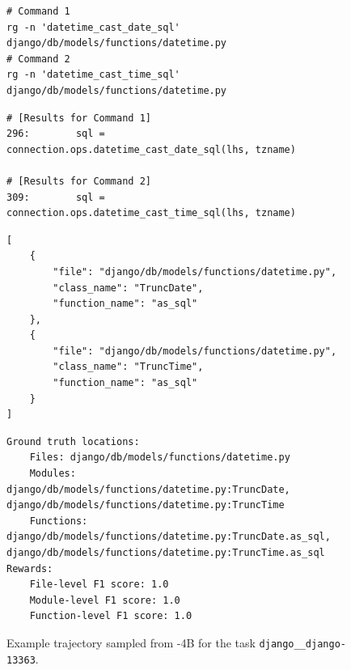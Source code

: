 \begin{figure}[!ht]
    \centering
\begin{tcolorbox}[colback=blue!3!white, colframe=blue!75!black, title={\small Action 3 (Terminal Tool - 2 parallel calls)}]
\begin{lstlisting}[basicstyle=\fontsize{7.5}{8.5}\ttfamily, breaklines=true]
# Command 1
rg -n 'datetime_cast_date_sql' django/db/models/functions/datetime.py
# Command 2
rg -n 'datetime_cast_time_sql' django/db/models/functions/datetime.py
\end{lstlisting}
\end{tcolorbox}

\begin{tcolorbox}[colback=orange!5!white, colframe=orange!75!black, title={\small Observation 3}]
\begin{lstlisting}[basicstyle=\fontsize{7.5}{8.5}\ttfamily, breaklines=true]
# [Results for Command 1]
296:        sql = connection.ops.datetime_cast_date_sql(lhs, tzname)

# [Results for Command 2]
309:        sql = connection.ops.datetime_cast_time_sql(lhs, tzname)
\end{lstlisting}
\end{tcolorbox}

\begin{tcolorbox}[colback=blue!3!white, colframe=blue!75!black, title={\small Action 4 (Localization Finish Tool - Agent Loop Terminated)}]
\begin{lstlisting}[basicstyle=\fontsize{7.5}{8.5}\ttfamily, breaklines=true]
[
    {
        "file": "django/db/models/functions/datetime.py",
        "class_name": "TruncDate",
        "function_name": "as_sql"
    },
    {
        "file": "django/db/models/functions/datetime.py",
        "class_name": "TruncTime",
        "function_name": "as_sql"
    }
]
\end{lstlisting}
\end{tcolorbox}
\begin{tcolorbox}[colback=violet!3!white, colframe=violet!75!black, title={\small Reward Computation}]
\begin{lstlisting}[basicstyle=\fontsize{7.5}{8.5}\ttfamily, breaklines=true]
Ground truth locations:
    Files: django/db/models/functions/datetime.py
    Modules: django/db/models/functions/datetime.py:TruncDate, django/db/models/functions/datetime.py:TruncTime
    Functions: django/db/models/functions/datetime.py:TruncDate.as_sql, django/db/models/functions/datetime.py:TruncTime.as_sql
Rewards:
    File-level F1 score: 1.0
    Module-level F1 score: 1.0
    Function-level F1 score: 1.0
\end{lstlisting}
\end{tcolorbox}
\caption{Example trajectory sampled from \methodname-4B for the task \texttt{django\_\_django-13363}.}
\label{fig:traj_4b_p2}
\end{figure}
